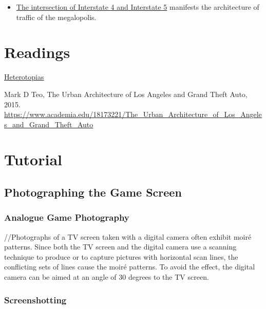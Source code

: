 \documentclass[
  openany]{book}
\providecommand{\tightlist}{%
  \setlength{\itemsep}{0pt}\setlength{\parskip}{0pt}}
\begin{document}
\begin{itemize}
\tightlist
\item
  \href{https://grandtheftdata.com/landmarks/\#951.507,-1144.265,4,atlas,name=trainyard_warehouse,Trainyard_Warehouse,_East_Los_Santos}{The intersection of Interstate 4 and Interstate 5} manifests the architecture of traffic of the megalopolis.
\end{itemize}

\hypertarget{readings}{%
\section*{Readings}\label{readings}}

\href{https://www.heterotopiaszine.com/}{Heterotopias}

Mark D Teo, The Urban Architecture of Los Angeles and Grand Theft Auto, 2015. \url{https://www.academia.edu/18173221/The_Urban_Architecture_of_Los_Angeles_and_Grand_Theft_Auto}

\hypertarget{tutorial}{%
\section*{Tutorial}\label{tutorial}}

\hypertarget{photographing-the-game-screen}{%
\subsection*{Photographing the Game Screen}\label{photographing-the-game-screen}}

\hypertarget{analogue-game-photography}{%
\subsubsection*{Analogue Game Photography}\label{analogue-game-photography}}

//Photographs of a TV screen taken with a digital camera often exhibit moiré patterns. Since both the TV screen and the digital camera use a scanning technique to produce or to capture pictures with horizontal scan lines, the conflicting sets of lines cause the moiré patterns. To avoid the effect, the digital camera can be aimed at an angle of 30 degrees to the TV screen.

\hypertarget{screenshotting}{%
\subsubsection*{Screenshotting}\label{screenshotting}}
\end{document}
